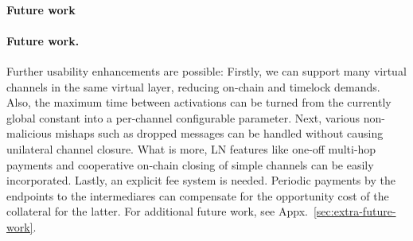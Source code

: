
\makeatletter%
%
  {\paragraph{Future work}}%
  {\paragraph{Future work.}}%
\makeatother%
Further usability enhancements are possible: Firstly, we can support many
virtual channels in the same virtual layer, reducing on-chain and timelock
demands. Also, the maximum time between activations can be turned from the
currently global constant into a per-channel configurable parameter. Next,
various non-malicious mishaps such as dropped messages can be handled without
causing unilateral channel closure. What is more, LN features like one-off
multi-hop payments and cooperative on-chain closing of simple channels can be
easily incorporated. Lastly, an explicit fee system is needed. Periodic payments
by the endpoints to the intermediares can compensate for the opportunity cost of
the collateral for the latter. For additional future work, see
Appx.~\ref{sec:extra-future-work}.

